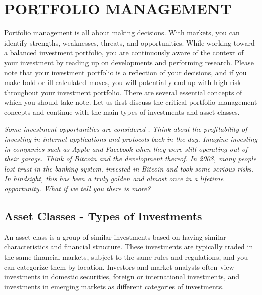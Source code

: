 \chapter{PORTFOLIO MANAGEMENT}

Portfolio management is all about making decisions. With markets, you can identify strengths, weaknesses, threats, and opportunities. While working toward a balanced investment portfolio, you are continuously aware of the context of your investment by reading up on developments and performing research. Please note that your investment portfolio is a reflection of your decisions, and if you make bold or ill-calculated moves, you will potentially end up with high risk throughout your investment portfolio. There are several essential concepts of which you should take note. Let us first discuss the critical portfolio management concepts and continue with the main types of investments and asset classes.\medskip 

 \medskip
    \begin{tcolorbox}
    [enhanced,
    title=Opportunity Management,
    frame style=
    {left color=orange!85!black,right color=yellow!95!black}]
        
            \textit{Some investment opportunities are considered . Think about the profitability of investing in internet applications and protocols back in the day. Imagine investing in companies such as Apple and Facebook when they were still operating out of their garage. Think of Bitcoin and the development thereof. In 2008, many people lost trust in the banking system, invested in Bitcoin and took some serious risks. In hindsight, this has been a truly golden and almost once in a lifetime opportunity. What if we tell you there is more?}
       
    \end{tcolorbox}


\section*{Asset Classes - Types of Investments}

An asset class is a group of similar investments based on having similar characteristics and financial structure. These investments are typically traded in the same financial markets, subject to the same rules and regulations, and you can categorize them by location. Investors and market analysts often view investments in domestic securities, foreign or international investments, and investments in emerging markets as different categories of investments. 

